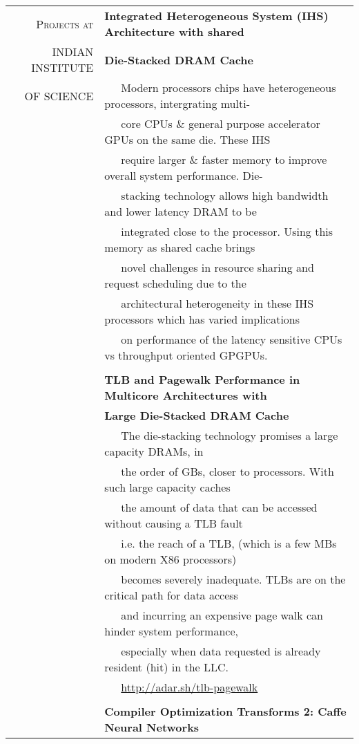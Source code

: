 \documentclass[a4paper,10pt]{article} %
\begin{document}
\begin{tabular}{rl}
\textsc{Projects at} & \textbf{Integrated Heterogeneous System (IHS) Architecture with shared} \\
\textsc{INDIAN INSTITUTE} & \textbf{Die-Stacked DRAM Cache \qquad {}} \\
\textsc{OF SCIENCE} & ~~~Modern processors chips have heterogeneous processors, intergrating multi-\\
& ~~~core CPUs \& general purpose accelerator GPUs on the same die. These IHS\\
& ~~~require larger \& faster memory to improve overall system performance. Die-\\
& ~~~stacking technology allows high bandwidth and lower latency DRAM to be\\
& ~~~integrated close to the processor. Using this memory as shared cache brings\\
& ~~~novel challenges in resource sharing and request scheduling due to the\\
& ~~~architectural heterogeneity in these IHS processors which has varied implications\\
& ~~~on performance of the latency sensitive CPUs vs throughput oriented GPGPUs.\\
& \\
& \textbf{TLB and Pagewalk Performance in Multicore Architectures with} \\
& \textbf{Large Die-Stacked DRAM Cache }\\
& ~~~The die-stacking technology promises a large capacity DRAMs, in\\
& ~~~the order of GBs, closer to processors. With such large capacity caches\\
& ~~~the amount of data that can be accessed without causing a TLB fault\\
& ~~~i.e. the reach of a TLB, (which is a few MBs on modern X86 processors)\\
& ~~~becomes severely inadequate. TLBs are on the critical path for data access\\
& ~~~and incurring an expensive page walk can hinder system performance,\\
& ~~~especially when data requested is already resident (hit) in the LLC.\\
& ~~~\href{http://adar.sh/tlb-pagewalk}{http://adar.sh/tlb-pagewalk}\\
& \\
& \textbf{Compiler Optimization Transforms 2: Caffe Neural Networks}\\

\end{tabular}
\end{document}
